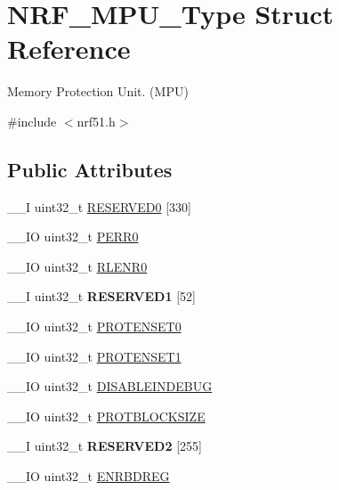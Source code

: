 \hypertarget{struct_n_r_f___m_p_u___type}{}\section{N\+R\+F\+\_\+\+M\+P\+U\+\_\+\+Type Struct Reference}
\label{struct_n_r_f___m_p_u___type}


Memory Protection Unit. (M\+P\+U)  




{\ttfamily \#include $<$nrf51.\+h$>$}

\subsection*{Public Attributes}
\begin{DoxyCompactItemize}
\item 
\+\_\+\+\_\+\+I uint32\+\_\+t \hyperlink{struct_n_r_f___m_p_u___type_aae5e5cd0babde76ba8a799b66132e466}{R\+E\+S\+E\+R\+V\+E\+D0} \mbox{[}330\mbox{]}
\item 
\+\_\+\+\_\+\+I\+O uint32\+\_\+t \hyperlink{struct_n_r_f___m_p_u___type_aeec29108d941d2736a279cccf037a1b8}{P\+E\+R\+R0}
\item 
\+\_\+\+\_\+\+I\+O uint32\+\_\+t \hyperlink{struct_n_r_f___m_p_u___type_a68229ed01c4052fbe934fdd7e3842a9e}{R\+L\+E\+N\+R0}
\item 
\hypertarget{struct_n_r_f___m_p_u___type_ab1339206d612a0c42d299fa0db76db7a}{}\+\_\+\+\_\+\+I uint32\+\_\+t {\bfseries R\+E\+S\+E\+R\+V\+E\+D1} \mbox{[}52\mbox{]}\label{struct_n_r_f___m_p_u___type_ab1339206d612a0c42d299fa0db76db7a}

\item 
\+\_\+\+\_\+\+I\+O uint32\+\_\+t \hyperlink{struct_n_r_f___m_p_u___type_a0e8b289c19e967c65aed85c9af04df60}{P\+R\+O\+T\+E\+N\+S\+E\+T0}
\item 
\+\_\+\+\_\+\+I\+O uint32\+\_\+t \hyperlink{struct_n_r_f___m_p_u___type_a309e19a51d9d7978148322d565c5a479}{P\+R\+O\+T\+E\+N\+S\+E\+T1}
\item 
\+\_\+\+\_\+\+I\+O uint32\+\_\+t \hyperlink{struct_n_r_f___m_p_u___type_a00763558c0e6ace69d8337979661da29}{D\+I\+S\+A\+B\+L\+E\+I\+N\+D\+E\+B\+U\+G}
\item 
\+\_\+\+\_\+\+I\+O uint32\+\_\+t \hyperlink{struct_n_r_f___m_p_u___type_ab2e8e26a7099d2888094d1ccad95b96c}{P\+R\+O\+T\+B\+L\+O\+C\+K\+S\+I\+Z\+E}
\item 
\hypertarget{struct_n_r_f___m_p_u___type_ac4943fc3a5f08e0bad13148736b658ef}{}\+\_\+\+\_\+\+I uint32\+\_\+t {\bfseries R\+E\+S\+E\+R\+V\+E\+D2} \mbox{[}255\mbox{]}\label{struct_n_r_f___m_p_u___type_ac4943fc3a5f08e0bad13148736b658ef}

\item 
\+\_\+\+\_\+\+I\+O uint32\+\_\+t \hyperlink{struct_n_r_f___m_p_u___type_a5651fcccf268d20955d3736cb20d0b3b}{E\+N\+R\+B\+D\+R\+E\+G}
\end{DoxyCompactItemize}


